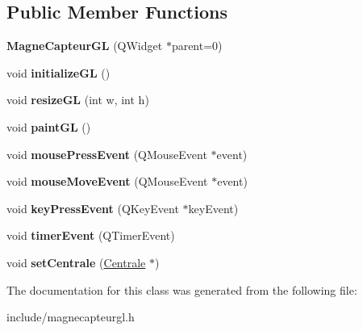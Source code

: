 \subsection*{Public Member Functions}
\begin{DoxyCompactItemize}
\item 
\hypertarget{class_magne_capteur_g_l_af255d52fd7e2087e7354713ec5cac746}{{\bfseries Magne\-Capteur\-G\-L} (Q\-Widget $\ast$parent=0)}\label{class_magne_capteur_g_l_af255d52fd7e2087e7354713ec5cac746}

\item 
\hypertarget{class_magne_capteur_g_l_ab123665862d2f7f74fb9d2e1474d93a9}{void {\bfseries initialize\-G\-L} ()}\label{class_magne_capteur_g_l_ab123665862d2f7f74fb9d2e1474d93a9}

\item 
\hypertarget{class_magne_capteur_g_l_ad22243500dde717f88518283eb63bfdb}{void {\bfseries resize\-G\-L} (int w, int h)}\label{class_magne_capteur_g_l_ad22243500dde717f88518283eb63bfdb}

\item 
\hypertarget{class_magne_capteur_g_l_a05307f63a70ff3450d789cb475a88e4f}{void {\bfseries paint\-G\-L} ()}\label{class_magne_capteur_g_l_a05307f63a70ff3450d789cb475a88e4f}

\item 
\hypertarget{class_magne_capteur_g_l_a87728602cd96af1b8d7ffaf82af2f31d}{void {\bfseries mouse\-Press\-Event} (Q\-Mouse\-Event $\ast$event)}\label{class_magne_capteur_g_l_a87728602cd96af1b8d7ffaf82af2f31d}

\item 
\hypertarget{class_magne_capteur_g_l_a6d8bcda030ed65be7768eef9879be390}{void {\bfseries mouse\-Move\-Event} (Q\-Mouse\-Event $\ast$event)}\label{class_magne_capteur_g_l_a6d8bcda030ed65be7768eef9879be390}

\item 
\hypertarget{class_magne_capteur_g_l_a5598cc821b1031b456f89d485abe4df1}{void {\bfseries key\-Press\-Event} (Q\-Key\-Event $\ast$key\-Event)}\label{class_magne_capteur_g_l_a5598cc821b1031b456f89d485abe4df1}

\item 
\hypertarget{class_magne_capteur_g_l_a65603b803edfb216365e0c5486d36d85}{void {\bfseries timer\-Event} (Q\-Timer\-Event)}\label{class_magne_capteur_g_l_a65603b803edfb216365e0c5486d36d85}

\item 
\hypertarget{class_magne_capteur_g_l_a36c9f461998b445c2d0138a7f40f843b}{void {\bfseries set\-Centrale} (\hyperlink{class_centrale}{Centrale} $\ast$)}\label{class_magne_capteur_g_l_a36c9f461998b445c2d0138a7f40f843b}

\end{DoxyCompactItemize}


The documentation for this class was generated from the following file\-:\begin{DoxyCompactItemize}
\item 
include/magnecapteurgl.\-h\end{DoxyCompactItemize}
